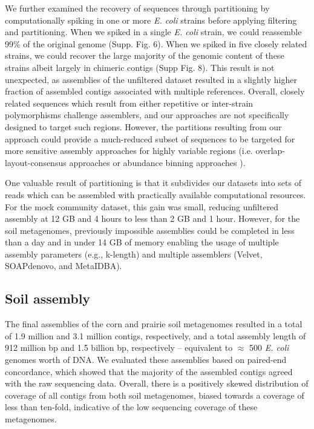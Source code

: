 \documentclass[11pt]{article} %
\begin{document}
We further examined the recovery of sequences through partitioning by
computationally spiking in one or more \emph{E. coli} strains before
applying filtering and partitioning.  When we spiked in a single
\emph{E. coli} strain, we could reassemble 99\% of the original genome
(Supp. Fig. 6).  When we spiked in five closely related strains,
we could recover the large majority of the genomic
content of these strains albeit largely in chimeric contigs (Supp
Fig. 8).  This result is not unexpected, as
assemblies of the unfiltered dataset resulted in a slightly higher
fraction of assembled contigs associated with multiple references.
Overall, closely related sequences which result from either repetitive
or inter-strain polymorphisms challenge assemblers, and our
approaches are not specifically designed to target such regions.
However, the partitions resulting from our approach could provide a much-reduced subset of sequences to be
targeted for more sensitive assembly approaches for highly variable regions
(i.e. overlap-layout-consensus approaches or abundance binning
approaches \cite{Sharon:2012kx}).

One valuable result of partitioning is that it subdivides our datasets
into sets of reads which can be assembled with practically available
computational resources.  For the mock community dataset, this gain
was small, reducing unfiltered assembly at 12 GB and 4 hours to less
than 2 GB and 1 hour.  However, for the soil metagenomes, previously
impossible assemblies could be completed in less than a day and in
under 14 GB of memory enabling the usage of multiple assembly
parameters (e.g., k-length) and multiple assemblers (Velvet,
SOAPdenovo, and MetaIDBA).

\subsection{Soil assembly}
The final assemblies of the corn and prairie soil metagenomes resulted
in a total of 1.9 million and 3.1 million contigs, respectively, and a
total assembly length of 912 million bp and 1.5 billion bp,
respectively -- equivalent to $\approx$ 500 \emph{E. coli} genomes worth of DNA.  We evaluated these assemblies based on paired-end concordance, which showed that the majority of the assembled contigs agreed with the raw sequencing data.  Overall,
there is a positively skewed distribution of coverage of all contigs
from both soil metagenomes, biased towards a coverage of less than
ten-fold, indicative of the low sequencing coverage of these
metagenomes.
\end{document}
